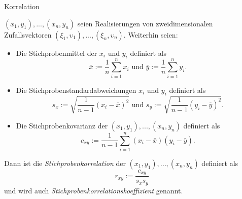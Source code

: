 \documentclass[
  8pt,
  ignorenonframetext,
]{beamer}
\newcommand{\ups}{\upsilon}
\begin{document}
\begin{frame}{Korrelation}
\protect\hypertarget{korrelation-3}{}
\footnotesize
\begin{definition}[Stichprobenkorrelation]
\justifying
$(x_1,y_1),...,(x_n,y_n)$ seien Realisierungen von zweidimensionalen Zufallsvektoren
$(\xi_1,\ups_1), ..., (\xi_n,\ups_n)$. Weiterhin seien:
\begin{itemize}
\item Die Stichprobenmittel der $x_i$ und $y_i$ definiert als
\begin{equation}
\bar{x} := \frac{1}{n}\sum_{i=1}^n x_i
\mbox{ und }
\bar{y} := \frac{1}{n}\sum_{i=1}^n y_i.
\end{equation}
\item Die Stichprobenstandardabweichungen $x_i$ und $y_i$ definiert als
\begin{equation}
s_x := \sqrt{\frac{1}{n-1}(x_i - \bar{x})^2}
\mbox{ und }
s_y := \sqrt{\frac{1}{n-1}(y_i - \bar{y})^2}.
\end{equation}
\item Die Stichprobenkovarianz der $(x_1,y_1),...,(x_n,y_n)$ definiert als
\begin{equation}
c_{xy} := \frac{1}{n-1}\sum_{i=1}^n (x_i - \bar{x})(y_i - \bar{y}).
\end{equation}
\end{itemize}
Dann ist die \textit{Stichprobenkorrelation} der $(x_1,y_1),...,(x_n,y_n)$ definiert als
\begin{equation}
r_{xy} := \frac{c_{xy}}{s_xs_y}
\end{equation}
und  wird auch \textit{Stichprobenkorrelationskoeffizient} genannt.
\end{definition}
\end{frame}
\end{document}
